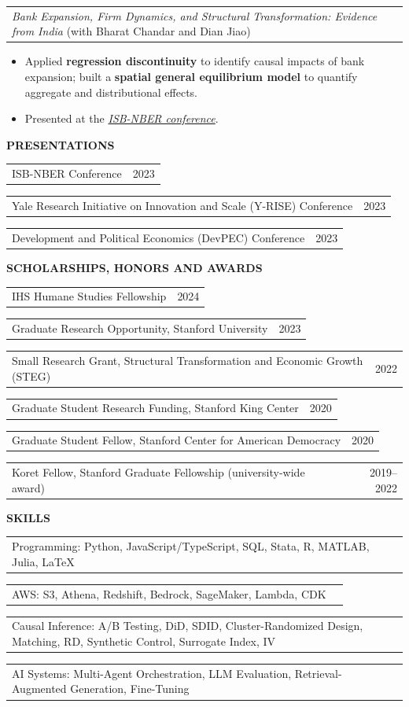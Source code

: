 \documentclass[10pt]{article}
\makeatletter
\newcommand{\entry}[2]{%
  \noindent\begin{tabularx}{\textwidth}{@{}X r@{}} #1 & #2 \end{tabularx}\par
}
\newcommand{\sect}[1]{\vspace{1.25em}\textbf{\large #1}\par\vspace{1.0em}}
\makeatother
\begin{document}
\entry{\textit{Bank Expansion, Firm Dynamics, and Structural Transformation: Evidence from India} \textnormal{(with Bharat Chandar and Dian Jiao)}}{}
\begin{itemize}
\small
    \item Applied \textbf{regression discontinuity} to identify causal impacts of bank expansion; built a \textbf{spatial general equilibrium model} to quantify aggregate and distributional effects.
    \item Presented at the \href{https://www.nber.org/conferences/capital-markets-technology-financial-inclusion-and-economic-growth-fall-2023}{\textit{ISB-NBER conference}}.
\end{itemize}

\sect{PRESENTATIONS}
\entry{ISB-NBER Conference}{2023}
\entry{Yale Research Initiative on Innovation and Scale (Y-RISE) Conference}{2023}
\entry{Development and Political Economics (DevPEC) Conference}{2023}

\sect{SCHOLARSHIPS, HONORS AND AWARDS}
\entry{IHS Humane Studies Fellowship}{2024}
\entry{Graduate Research Opportunity, Stanford University}{2023}
\entry{Small Research Grant, Structural Transformation and Economic Growth (STEG)}{2022}
\entry{Graduate Student Research Funding, Stanford King Center}{2020}
\entry{Graduate Student Fellow, Stanford Center for American Democracy}{2020}
\entry{Koret Fellow, Stanford Graduate Fellowship (university-wide award)}{2019--2022}

\sect{SKILLS}
\entry{Programming: Python, JavaScript/TypeScript, SQL, Stata, R, MATLAB, Julia, \LaTeX}{}%
\entry{AWS: S3, Athena, Redshift, Bedrock, SageMaker, Lambda, CDK}{}%
\entry{Causal Inference: A/B Testing, DiD, SDID, Cluster-Randomized Design, Matching, RD, Synthetic Control, Surrogate Index, IV}{}%
\entry{AI Systems: Multi-Agent Orchestration, LLM Evaluation, Retrieval-Augmented Generation, Fine-Tuning}{}%
\end{document}
